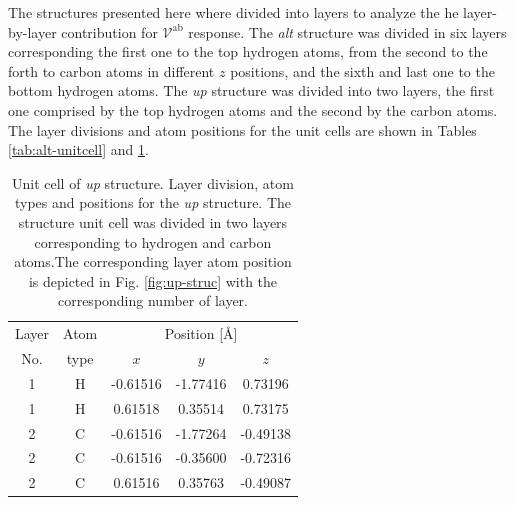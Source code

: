 \documentclass[prb,11pt,tightenlines,twocolumn,aps]{revtex4-1}
\begin{document}
The structures presented here where divided into layers to analyze the he
layer-by-layer contribution for $\mathcal{V}^{\mathrm{ab}}$ response. The
\emph{alt} structure was divided in six layers corresponding the first one to
the top hydrogen atoms, from the second to the forth to carbon atoms in
different $z$ positions, and the sixth and last one to the bottom hydrogen
atoms. The \emph{up} structure was divided into two layers, the first one
comprised by the top hydrogen atoms and the second by the carbon atoms. The
layer divisions and atom positions for the unit cells are shown in Tables
\ref{tab:alt-unitcell} and \ref{tab:up-unitcell}.

\begin{table}[tb]
\center
\begin{tabular}{ccccc}\\
\hline
Layer & Atom & \multicolumn{3}{c}{Position [\AA]} \\
\cline{3-5}
No. & type & $x$ & $y$ & $z$  \\
\hline
1 & H & -0.61516 & -1.77416 &  0.73196 \\
1 & H &  0.61518 &  0.35514 &  0.73175 \\
2 & C & -0.61516 & -1.77264 & -0.49138 \\
2 & C & -0.61516 & -0.35600 & -0.72316 \\
2 & C &  0.61516 &  0.35763 & -0.49087 \\
\hline
\end{tabular}
\caption{Unit cell of \emph{up} structure. Layer division, atom types and
positions for the \emph{up} structure. The structure unit cell was divided in
two layers corresponding to hydrogen and carbon atoms.The corresponding layer
atom position is depicted in Fig. \ref{fig:up-struc} with the corresponding
number of layer.}
\label{tab:up-unitcell}
\end{table}



\end{document}

